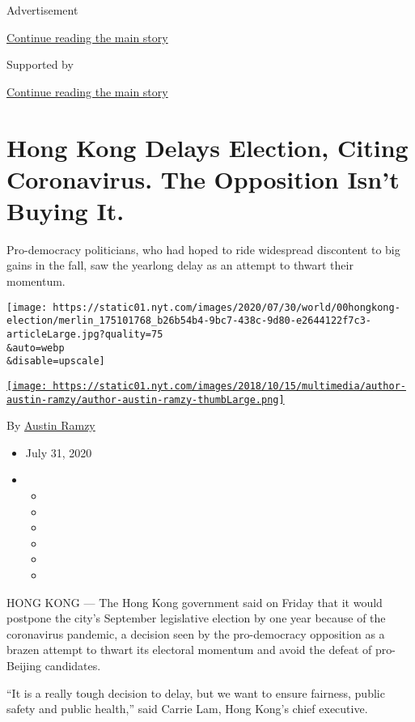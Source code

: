 Advertisement

\protect\hyperlink{after-top}{Continue reading the main story}

Supported by

\protect\hyperlink{after-sponsor}{Continue reading the main story}

\hypertarget{hong-kong-delays-election-citing-coronavirus-the-opposition-isnt-buying-it}{%
\section{Hong Kong Delays Election, Citing Coronavirus. The Opposition
Isn't Buying
It.}\label{hong-kong-delays-election-citing-coronavirus-the-opposition-isnt-buying-it}}

Pro-democracy politicians, who had hoped to ride widespread discontent
to big gains in the fall, saw the yearlong delay as an attempt to thwart
their momentum.

\texttt{[image: https://static01.nyt.com/images/2020/07/30/world/00hongkong-election/merlin\_175101768\_b26b54b4-9bc7-438c-9d80-e2644122f7c3-articleLarge.jpg?quality=75\\\&auto=webp\\\&disable=upscale]}

\href{https://www.nytimes.com/by/austin-ramzy}{\texttt{[image: https://static01.nyt.com/images/2018/10/15/multimedia/author-austin-ramzy/author-austin-ramzy-thumbLarge.png]}}

By \href{https://www.nytimes.com/by/austin-ramzy}{Austin Ramzy}

\begin{itemize}
\item
  July 31, 2020
\item
  \begin{itemize}
  \item
  \item
  \item
  \item
  \item
  \item
  \end{itemize}
\end{itemize}

HONG KONG --- The Hong Kong government said on Friday that it would
postpone the city's September legislative election by one year because
of the coronavirus pandemic, a decision seen by the pro-democracy
opposition as a brazen attempt to thwart its electoral momentum and
avoid the defeat of pro-Beijing candidates.

``It is a really tough decision to delay, but we want to ensure
fairness, public safety and public health,'' said Carrie Lam, Hong
Kong's chief executive.

